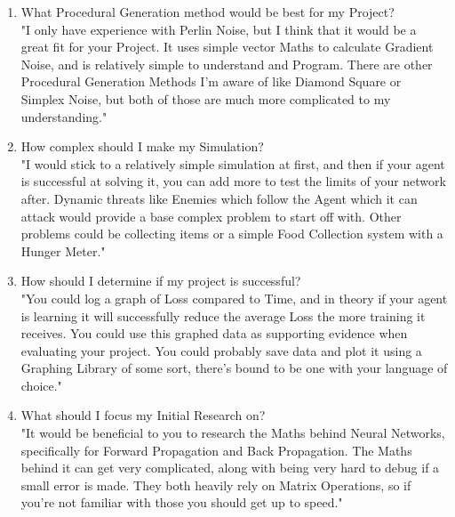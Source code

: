 \begin{flushleft}
\begin{enumerate}
                    \item {\large What Procedural Generation method would be best for my Project?} \\
                    \vspace{0.2cm}
                    "I only have experience with Perlin Noise, but I think that it would be a great fit for your Project. It uses simple vector Maths
                    to calculate Gradient Noise, and is relatively simple to understand and Program. There are other Procedural Generation Methods
                    I'm aware of like Diamond Square or Simplex Noise, but both of those are much more complicated to my understanding."

                    \item {\large How complex should I make my Simulation?} \\
                    \vspace{0.2cm}
                    "I would stick to a relatively simple simulation at first, and then if your agent is successful at solving it, you can add more
                    to test the limits of your network after. Dynamic threats like Enemies which follow the Agent which it can attack would provide a base 
                    complex problem to start off with. Other problems could be collecting items or a simple Food Collection system with a Hunger Meter."

                    \item {\large How should I determine if my project is successful?} \\
                    \vspace{0.2cm}
                    "You could log a graph of Loss compared to Time, and in theory if your agent is learning it will successfully reduce the average Loss 
                    the more training it receives. You could use this graphed data as supporting evidence when evaluating your project. You could probably
                    save data and plot it using a Graphing Library of some sort, there's bound to be one with your language of choice."

                    \item {\large What should I focus my Initial Research on?} \\
                    \vspace{0.2cm}
                    "It would be beneficial to you to research the Maths behind Neural Networks, specifically for Forward Propagation
                    and Back Propagation. The Maths behind it can get very complicated, along with being very hard to debug if a small error is made.
                    They both heavily rely on Matrix Operations, so if you're not familiar with those you should get up to speed."
                \end{enumerate}

\end{flushleft}
